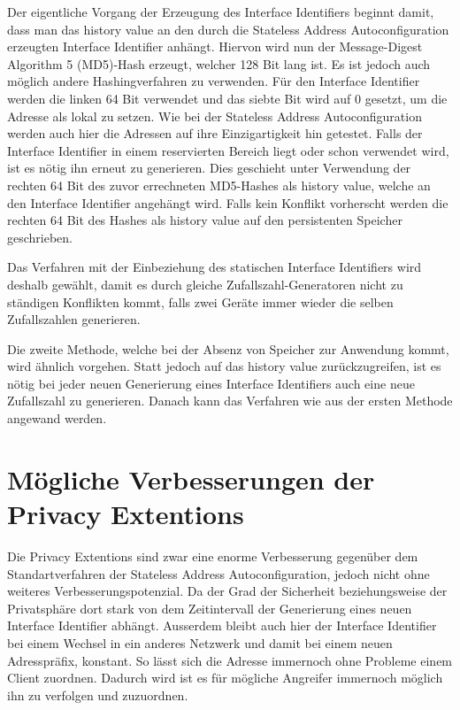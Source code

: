 \documentclass[a4paper, 12pt]{scrartcl}
\begin{document}
Der eigentliche Vorgang der Erzeugung des Interface Identifiers beginnt damit, dass man das history value an den durch die Stateless Address Autoconfiguration erzeugten Interface Identifier anhängt.
Hiervon wird nun der Message-Digest Algorithm 5 (MD5)-Hash erzeugt, welcher 128 Bit lang ist.
Es ist jedoch auch möglich andere Hashingverfahren zu verwenden.
Für den Interface Identifier werden die linken 64 Bit verwendet und das siebte Bit wird auf 0 gesetzt, um die Adresse als lokal zu setzen.
Wie bei der Stateless Address Autoconfiguration werden auch hier die Adressen auf ihre Einzigartigkeit hin getestet.
Falls der Interface Identifier in einem reservierten Bereich liegt oder schon verwendet wird, ist es nötig ihn erneut zu generieren.
Dies geschieht unter Verwendung der rechten 64 Bit des zuvor errechneten MD5-Hashes als history value, welche an den Interface Identifier angehängt wird.
Falls kein Konflikt vorherscht werden die rechten 64 Bit des Hashes als history value auf den persistenten Speicher geschrieben.

Das Verfahren mit der Einbeziehung des statischen Interface Identifiers wird deshalb gewählt, damit es durch gleiche Zufallszahl-Generatoren nicht zu ständigen Konflikten kommt, falls zwei Geräte immer wieder die selben Zufallszahlen generieren.


Die zweite Methode, welche bei der Absenz von Speicher zur Anwendung kommt, wird ähnlich vorgehen.
Statt jedoch auf das history value zurückzugreifen, ist es nötig bei jeder neuen Generierung eines Interface Identifiers auch eine neue Zufallszahl zu generieren. 
Danach kann das Verfahren wie aus der ersten Methode angewand werden.

\newpage

\section{Mögliche Verbesserungen der Privacy Extentions}
Die Privacy Extentions sind zwar eine enorme Verbesserung gegenüber dem Standartverfahren der Stateless Address Autoconfiguration, jedoch nicht ohne weiteres Verbesserungspotenzial.
Da der Grad der Sicherheit beziehungsweise der Privatsphäre dort stark von dem Zeitintervall der Generierung eines neuen Interface Identifier abhängt.
Ausserdem bleibt auch hier der Interface Identifier bei einem Wechsel in ein anderes Netzwerk und damit bei einem neuen Adresspräfix, konstant. 
So lässt sich die Adresse immernoch ohne Probleme einem Client zuordnen. Dadurch wird ist es für mögliche Angreifer immernoch möglich ihn zu verfolgen und zuzuordnen.
\end{document}
